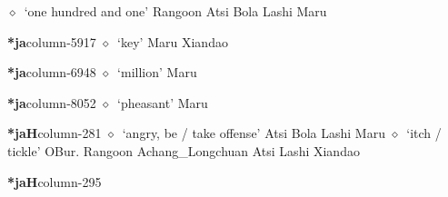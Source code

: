          $\diamond$~`one hundred and one'
         Rangoon 
\hspace{1ex}
         Atsi 
\hspace{1ex}
         Bola 
\hspace{1ex}
         Lashi 
\hspace{1ex}
         Maru 
  \item {\footnotesize \textbf{*ja}}{\tiny column-5917}
         $\diamond$~`key'
         Maru 
\hspace{1ex}
         Xiandao 
  \item {\footnotesize \textbf{*ja}}{\tiny column-6948}
         $\diamond$~`million'
         Maru 
  \item {\footnotesize \textbf{*ja}}{\tiny column-8052}
         $\diamond$~`pheasant'
         Maru 
  \item {\footnotesize \textbf{*jaH}}{\tiny column-281}
         $\diamond$~`angry, be / take offense'
         Atsi 
\hspace{1ex}
         Bola 
\hspace{1ex}
         Lashi 
\hspace{1ex}
         Maru 
\hspace{1ex}
         $\diamond$~`itch / tickle'
         OBur. 
\hspace{1ex}
         Rangoon 
\hspace{1ex}
         Achang\_Longchuan 
\hspace{1ex}
         Atsi 
\hspace{1ex}
         Lashi 
\hspace{1ex}
         Xiandao 
  \item {\footnotesize \textbf{*jaH}}{\tiny column-295}
